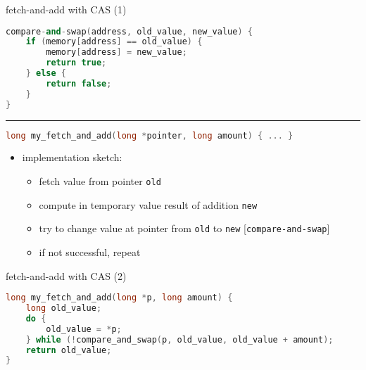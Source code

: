 \begin{frame}[fragile,label=fetchAndAddWithCASSetup]{fetch-and-add with CAS (1)}
\begin{lstlisting}[language=C++,style=smaller,deletekeywords=register]
compare-and-swap(address, old_value, new_value) {
    if (memory[address] == old_value) {
        memory[address] = new_value;
        return true;
    } else {
        return false;
    }
}
\end{lstlisting}
\hrule
\begin{lstlisting}[language=C++,style=smaller,deletekeywords=register]
long my_fetch_and_add(long *pointer, long amount) { ... }
\end{lstlisting}
    \begin{itemize}
    \item implementation sketch:
        \begin{itemize}
        \item fetch value from pointer \texttt{old}
        \item compute in temporary value result of addition \texttt{new}
        \item try to change value at pointer from \texttt{old} to \texttt{new} [\texttt{compare-and-swap}]
        \item if not successful, repeat
        \end{itemize}
    \end{itemize}
\end{frame}

\begin{frame}[fragile,label=fetchAndAddWithCASSoln]{fetch-and-add with CAS (2)}
\begin{lstlisting}[language=C++,style=smaller,deletekeywords=register]
long my_fetch_and_add(long *p, long amount) {
    long old_value;
    do {
        old_value = *p;
    } while (!compare_and_swap(p, old_value, old_value + amount);
    return old_value;
}
\end{lstlisting}
\end{frame}

